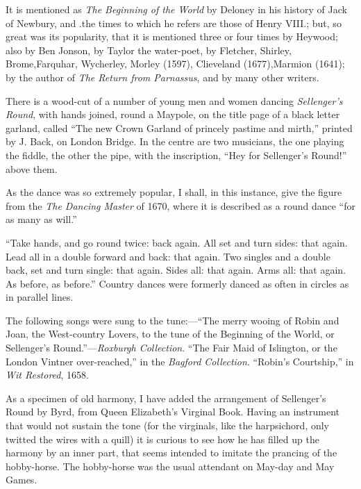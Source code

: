 It is mentioned as \textit{The Beginning of the World} by Deloney in his history of
Jack of Newbury, and .the times to which he refers are those of Henry VIII.;
but, so great was its popularity, that it is mentioned three or four times by
Heywood; also by Ben Jonson, by Taylor the water-poet, by Fletcher, Shirley,
Brome,Farquhar, Wycherley, Morley (1597), Clieveland (1677),Marmion (1641);
by the author of \textit{The Return from Parnassus}, and by many other writers.

There is a wood-cut of a number of young men and women dancing \textit{Sellenger’s
Round}, with hands joined, round a Maypole, on the title page of a black letter
garland, called “The new Crown Garland of princely pastime and mirth,” printed
by J. Back, on London Bridge. In the centre are two musicians, the one playing
the fiddle, the other the pipe, with the inscription, “Hey for Sellenger’s Round!”
above them.

As the dance was so extremely popular, I shall, in this instance, give the figure
from the \textit{The Dancing Master} of 1670, where it is described as a round dance
“for as many as will.”

“Take hands, and go round twice: \pagebreak
back again. All set and turn sides: that
again. Lead all in a double forward and back: that again. Two singles and a
double back, set and turn single: that again. Sides all: that again. Arms all:
that again. As before, as before.” Country dances were formerly danced as
often in circles as in parallel lines.

The following songs were sung to the tune:—“The merry wooing of Robin and
Joan, the West-country Lovers, to the tune of the Beginning of the World, or
Sellenger’s Round.”—\textit{Roxburgh Collection}. “The Fair Maid of Islington, or the
London Vintner over-reached,” in the \textit{Bagford Collection}. “Robin’s Courtship,”
in \textit{Wit Restored}, 1658.

As a specimen of old harmony, I have added the arrangement of Sellenger’s
Round by Byrd, from Queen Elizabeth’s Virginal Book. Having an instrument
that would not sustain the tone (for the virginals, like the harpsichord, only
twitted the wires with a quill) it is curious to see how he has filled up the harmony
by an inner part, that seems intended to imitate the prancing of the hobby-horse.
The hobby-horse was the usual attendant on May-day and May Games.


\smallskip

